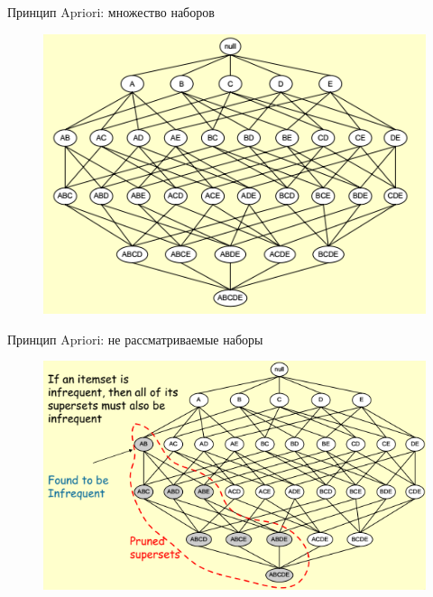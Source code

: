 \documentclass{beamer}
\begin{document}
\begin{frame}{Принцип Apriori: множество наборов}
	\begin{figure}[h]
		\centering
		\includegraphics[scale=0.75]{images/lec08-pic10.png}
	\end{figure}
\end{frame}

\begin{frame}{Принцип Apriori: не рассматриваемые наборы}
	\begin{figure}[h]
		\centering
		\includegraphics[scale=0.75]{images/lec08-pic11.png}
	\end{figure}
\end{frame}
\end{document}
